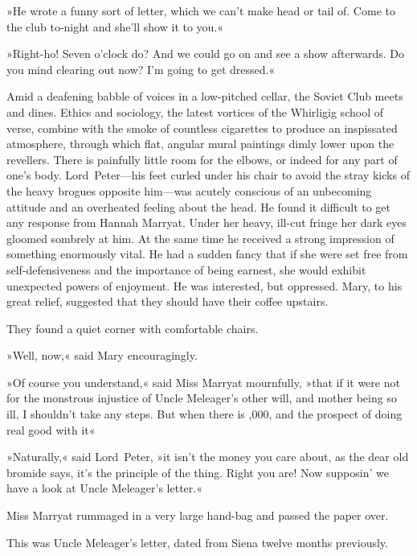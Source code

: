 »He wrote a funny sort of letter, which we can't make head or tail of. Come to the club to-night and she'll show it to you.«

»Right-ho! Seven o'clock do? And we could go on and see a show afterwards. Do you mind clearing out now? I'm going to get dressed.«

\divider
Amid a deafening babble of voices in a low-pitched cellar, the Soviet Club meets and dines. Ethics and sociology, the latest vortices of the Whirligig school of verse, combine with the smoke of countless cigarettes to produce an inspissated atmosphere, through which flat, angular mural paintings dimly lower upon the revellers. There is painfully little room for the elbows, or indeed for any part of one's body. Lord~Peter—his feet curled under his chair to avoid the stray kicks of the heavy brogues opposite him—was acutely conscious of an unbecoming attitude and an overheated feeling about the head. He found it difficult to get any response from Hannah Marryat. Under her heavy, ill-cut fringe her dark eyes gloomed sombrely at him. At the same time he received a strong impression of something enormously vital. He had a sudden fancy that if she were set free from self-defensiveness and the importance of being earnest, she would exhibit unexpected powers of enjoyment. He was interested, but oppressed. Mary, to his great relief, suggested that they should have their coffee upstairs.

They found a quiet corner with comfortable chairs.

»Well, now,« said Mary encouragingly.

»Of course you understand,« said Miss Marryat mournfully, »that if it were not for the monstrous injustice of Uncle Meleager's other will, and mother being so ill, I shouldn't take any steps. But when there is ,000, and the prospect of doing real good with it\longdash«

»Naturally,« said Lord~Peter, »it isn't the money you care about, as the dear old bromide says, it's the principle of the thing. Right you are! Now supposin' we have a look at Uncle Meleager's letter.«

Miss Marryat rummaged in a very large hand-bag and passed the paper over.

This was Uncle Meleager's letter, dated from Siena twelve months previously.

\makeatletter
{}
{%

}{%
	\enlargethispage{\baselineskip}
}
\makeatother

